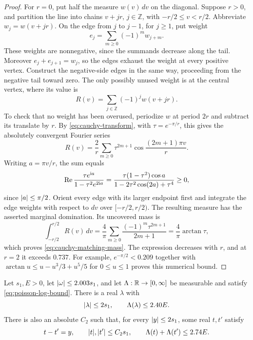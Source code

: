 \begin{proof}
For $r=0$, put half the measure $w(v)\,dv$ on the diagonal.  Suppose $r>0$,
and partition the line into chains $v+jr$, $j\in\mathbb Z$, with
$-r/2\le v<r/2$.  Abbreviate $w_j=w(v+jr)$.  On the edge from $j$ to $j-1$,
for $j\ge1$, put weight
\[
 e_j=\sum_{m\ge0}(-1)^m w_{j+m}.
\]
These weights are nonnegative, since the summands decrease along the tail.
Moreover $e_j+e_{j+1}=w_j$, so the edges exhaust the weight at every positive
vertex.  Construct the negative-side edges in the same way, proceeding from
the negative tail toward zero.  The only possibly unused weight is at the
central vertex, where its value is
\[
 R(v)=\sum_{j\in\mathbb Z}(-1)^j w(v+jr).
\]
To check that no weight has been overused, periodize $w$ at period $2r$ and
subtract its translate by $r$.  By \eqref{eq:cauchy-transform}, with
$\tau=e^{-\pi/r}$, this gives the absolutely convergent Fourier series
\[
 R(v)=\frac2r\sum_{m\ge0}\tau^{2m+1}
                  \cos\frac{(2m+1)\pi v}{r}.
\]
Writing $a=\pi v/r$, the sum equals
\[
 \operatorname{Re}\frac{\tau e^{\mathrm i a}}{1-\tau^2e^{2\mathrm i a}}
 =\frac{\tau(1-\tau^2)\cos a}
        {1-2\tau^2\cos(2a)+\tau^4}\ge0,
\]
since $\lvert a\rvert\le\pi/2$.  Orient every edge with its larger endpoint first
and integrate the edge weights with respect to $dv$ over $[-r/2,r/2)$.
The resulting measure has the asserted marginal domination.  Its uncovered
mass is
\[
 \int_{-r/2}^{r/2}R(v)\,dv
 =\frac4\pi\sum_{m\ge0}\frac{(-1)^m\tau^{2m+1}}{2m+1}
 =\frac4\pi\arctan\tau,
\]
which proves \eqref{eq:cauchy-matching-mass}.  The expression decreases with
$r$, and at $r=2$ it exceeds $0.737$.  For example,
$e^{-\pi/2}<0.209$ together with
$\arctan u\le u-u^3/3+u^5/5$ for $0\le u\le1$ proves this numerical bound.
\end{proof}

\begin{lemma}\label{lem:good-frequencies}
Let $s_1,E>0$, let $\lvert \omega\rvert\le2.003s_1$, and let
$\Lambda:\mathbb R\to[0,\infty]$ be measurable and satisfy
\eqref{eq:poisson-log-bound}.  There is a real $\lambda$ with
\begin{equation}\label{eq:single-frequency}
 \lvert \lambda\rvert\le2s_1,\qquad \Lambda(\lambda)\le2.40E.
\end{equation}
There is also an absolute $C_2$ such that, for every $\lvert y\rvert\le2s_1$, some
real $t,t'$ satisfy
\begin{equation}\label{eq:paired-frequencies}
 t-t'=y,\qquad \lvert t\rvert,\lvert t'\rvert\le C_2s_1,\qquad
 \Lambda(t)+\Lambda(t')\le2.74E.
\end{equation}
\end{lemma}

